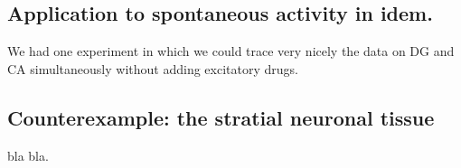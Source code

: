 \documentclass[12pt]{article}
\begin{document}
\subsection{Application to spontaneous activity in idem.}

We had one experiment in which we could trace very nicely the data on DG and CA simultaneously without adding excitatory drugs. 

\subsection{Counterexample: the stratial neuronal tissue}

bla bla.


 
\end{document}

